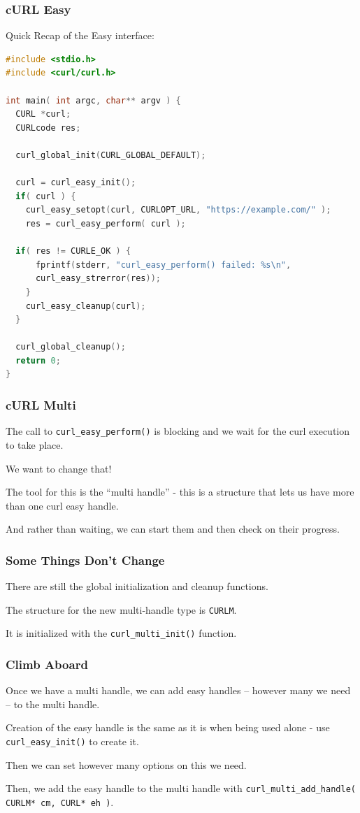 \begin{frame}[fragile]
	\frametitle{cURL Easy}

	Quick Recap of the Easy interface:

	\begin{lstlisting}[language=C]
#include <stdio.h>
#include <curl/curl.h>
 
int main( int argc, char** argv ) {
  CURL *curl;
  CURLcode res;
 
  curl_global_init(CURL_GLOBAL_DEFAULT);
 
  curl = curl_easy_init();
  if( curl ) {
    curl_easy_setopt(curl, CURLOPT_URL, "https://example.com/" );
    res = curl_easy_perform( curl );
    
  if( res != CURLE_OK ) {
      fprintf(stderr, "curl_easy_perform() failed: %s\n", 
      curl_easy_strerror(res));
    }
    curl_easy_cleanup(curl);
  }
 
  curl_global_cleanup();
  return 0;
}
\end{lstlisting}


\end{frame}

\begin{frame}
	\frametitle{cURL Multi}

	The call to \texttt{curl\_easy\_perform()} is blocking and we wait for the curl execution to take place.

	We want to change that!

	The tool for this is the ``multi handle'' - this is a structure that lets us have more than one curl easy handle.

	And rather than waiting, we can start them and then check on their progress.

\end{frame}


\begin{frame}
	\frametitle{Some Things Don't Change}

	There are still the global initialization and cleanup functions.

	The structure for the new multi-handle type is \texttt{CURLM}.

	It is initialized with the \texttt{curl\_multi\_init()} function.

\end{frame}


\begin{frame}
	\frametitle{Climb Aboard}

	Once we have a multi handle, we can add easy handles -- however many we need -- to the multi handle.

	Creation of the easy handle is the same as it is when being used alone - use \texttt{curl\_easy\_init()} to create it.

	Then we can set however many options on this we need.

	Then, we add the easy handle to the multi handle with \texttt{curl\_multi\_add\_handle( CURLM* cm, CURL* eh )}.


\end{frame}

